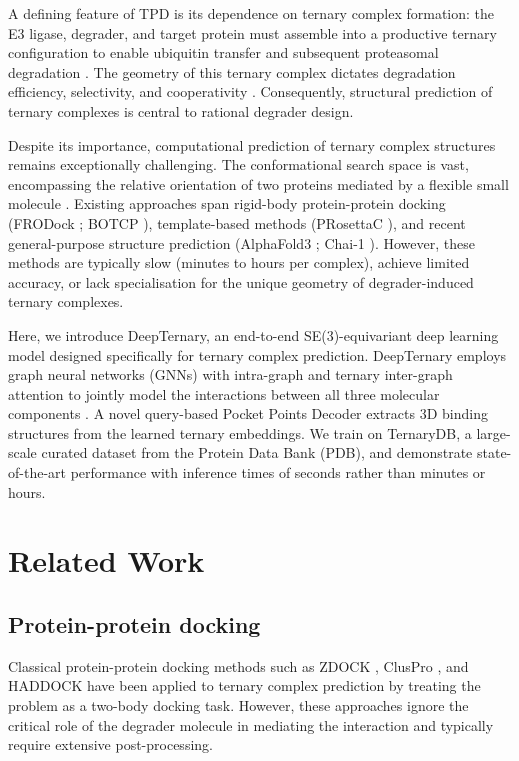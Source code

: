 \documentclass[11pt]{article}
\begin{document}
A defining feature of TPD is its dependence on ternary complex formation: the E3 ligase, degrader, and target protein must assemble into a productive ternary configuration to enable ubiquitin transfer and subsequent proteasomal degradation \citep{schiemer2021,faust2021}. The geometry of this ternary complex dictates degradation efficiency, selectivity, and cooperativity \citep{gadd2017,roy2019}. Consequently, structural prediction of ternary complexes is central to rational degrader design.

Despite its importance, computational prediction of ternary complex structures remains exceptionally challenging. The conformational search space is vast, encompassing the relative orientation of two proteins mediated by a flexible small molecule \citep{drummond2020,zaidman2020}. Existing approaches span rigid-body protein-protein docking (FRODock \citep{garzon2009}; BOTCP \citep{bai2021}), template-based methods (PRosettaC \citep{zaidman2020}), and recent general-purpose structure prediction (AlphaFold3 \citep{abramson2024}; Chai-1 \citep{chai2024}). However, these methods are typically slow (minutes to hours per complex), achieve limited accuracy, or lack specialisation for the unique geometry of degrader-induced ternary complexes.

Here, we introduce DeepTernary, an end-to-end SE(3)-equivariant deep learning model designed specifically for ternary complex prediction. DeepTernary employs graph neural networks (GNNs) with intra-graph and ternary inter-graph attention to jointly model the interactions between all three molecular components \citep{satorras2021,thomas2018}. A novel query-based Pocket Points Decoder extracts 3D binding structures from the learned ternary embeddings. We train on TernaryDB, a large-scale curated dataset from the Protein Data Bank (PDB), and demonstrate state-of-the-art performance with inference times of seconds rather than minutes or hours.

\section{Related Work}

\subsection{Protein-protein docking}
Classical protein-protein docking methods such as ZDOCK \citep{pierce2014}, ClusPro \citep{kozakov2017}, and HADDOCK \citep{vanZundert2016} have been applied to ternary complex prediction by treating the problem as a two-body docking task. However, these approaches ignore the critical role of the degrader molecule in mediating the interaction and typically require extensive post-processing.
\end{document}
